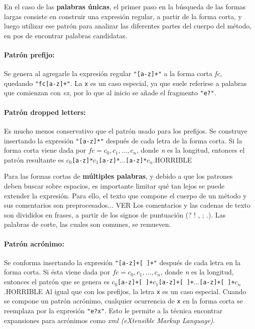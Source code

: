 {En el caso de las \textbf{palabras únicas}, el primer paso en la búsqueda de las formas largas consiste en construir una expresión regular, a partir de la forma corta, y luego utilizar ese patrón para analizar las diferentes partes del cuerpo del método, en pos de encontrar palabras candidatas.

\paragraph{Patrón prefijo:}
Se genera al agregarle la expresión regular \verb;"[a-z]+"; a la forma corta \textit{fc}, quedando \verb;"fc[a-z]+";.
La \verb;x; es un caso especial, ya que suele referirse a palabras que comienzan con \textit{ex}, por lo que al inicio se añade el fragmento \verb;"e?";.

\paragraph{Patrón dropped letters:}
Es mucho menos conservativo que el patrón usado para los prefijos.
Se construye insertando la expresión \verb;"[a-z]*"; después de cada letra de la forma corta.
Si la forma corta viene dada por $fc = c_0, c_1,\dots, c_n$, donde \textit{n} es la longitud, entonces el patrón resultante es $c_0$\verb;[a-z]*;$c_1$\verb;[a-z]*;$\dots$\verb;[a-z]*;$c_n$.HORRIBLE

Para las formas cortas de \textbf{múltiples palabras}, y debido a que los patrones deben buscar sobre espacios, es importante limitar qué tan lejos se puede extender la expresión.
Para ello, el texto que compone el cuerpo de un método y sus comentarios son preprocesados... VER
Los comentarios y las cadenas de texto son divididos en frases, a partir de los signos de puntuación (? ! , ; .).
Las palabras de corte, las cuales son comunes, se remueven.

\paragraph{Patrón acrónimo:}
Se conforma insertando la expresión \verb;"[a-z]+[ ]+"; después de cada letra en la forma corta.
Si ésta viene dada por $fc = c_0, c_1,\dots, c_n$, donde \textit{n} es la longitud, entonces el patrón que se genera es $c_0$\verb;[a-z]+[ ]+;$c_1$\verb;[a-z]+[ ]+;$\dots$\verb;[a-z]+[ ]+;$c_n$.HORRIBLE
Al igual que con los prefijos, la letra \verb;x; es un caso especial.
Cuando se compone un patrón acrónimo, cualquier ocurrencia de \verb;x; en la forma corta se reemplaza por la expresión \verb;"e?x";.
Esto le permite a la técnica encontrar expansiones para acrónimos como \textit{xml (eXtensible Markup Language)}.

}
